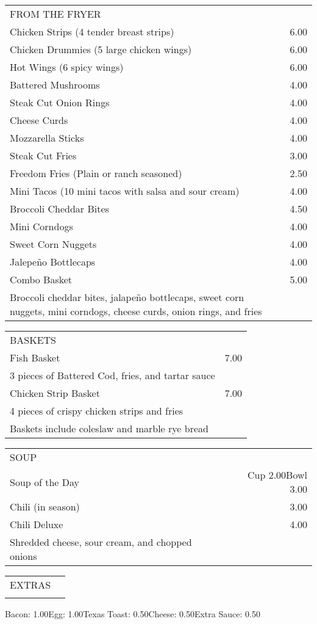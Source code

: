 \documentclass[10pt,notitlepage]{article}
\makeatletter
\newcommand*\ColText[1]{\uppercase{#1}}
\newenvironment{Group}[1]
	{\noindent\begin{tabular*}{\textwidth}{@{}p{.8\linewidth}@{\extracolsep{\fill}}r@{}}
		{\centering\fontsize{16}{20}\selectfont\ColText{#1}}\\[0.8em]\par}
	{\end{tabular*}}
\newcommand*\Item[2]{%
	\sffamily#1\dotfill & #2}
\newcommand*\Desc[1]{%
	\hspace*{1em}\footnotesize #1}
\makeatother
\begin{document}
	\begin{Group}{From the Fryer}
		\Item{Chicken Strips (4 tender breast strips)}{6.00} \\
		\Item{Chicken Drummies (5 large chicken wings)}{6.00} \\
		\Item{Hot Wings (6 spicy wings)}{6.00} \\
		\Item{Battered Mushrooms}{4.00} \\
		\Item{Steak Cut Onion Rings}{4.00} \\
		\Item{Cheese Curds}{4.00} \\
		\Item{Mozzarella Sticks}{4.00} \\
		\Item{Steak Cut Fries}{3.00} \\
		\Item{Freedom Fries (Plain or ranch seasoned)}{2.50} \\
		\Item{Mini Tacos (10 mini tacos with salsa and sour cream)}{4.00} \\
		\Item{Broccoli Cheddar Bites}{4.50} \\
		\Item{Mini Corndogs}{4.00} \\
		\Item{Sweet Corn Nuggets}{4.00} \\
		\Item{Jalepe\~{n}o Bottlecaps}{4.00} \\
		\Item{Combo Basket}{5.00} \\
		\Desc{Broccoli cheddar bites, jalape\~{n}o bottlecaps, sweet corn nuggets, mini corndogs, cheese curds, onion rings, and fries} \\
	\end{Group}
	
	\vfill{}
	
	\begin{Group}{Baskets}
		\Item{Fish Basket}{7.00} \\
		\Desc{3 pieces of Battered Cod, fries, and tartar sauce} \\
		\Item{Chicken Strip Basket}{7.00} \\
		\Desc{4 pieces of crispy chicken strips and fries} \\
		Baskets include coleslaw and marble rye bread
	\end{Group}
	
	\vfill{}
	
	\begin{Group}{Soup}
		\Item{Soup of the Day}{Cup 2.00\hspace{0.2in}Bowl 3.00} \\
		\Item{Chili (in season)}{3.00} \\
		\Item{Chili Deluxe}{4.00} \\
		\Desc{Shredded cheese, sour cream, and chopped onions} \\
	\end{Group}
	
	\vfill{}
	
	\begin{Group}{Extras}
	\end{Group}
	\centering Bacon: 1.00\hspace{0.2in}Egg: 1.00\hspace{0.2in}Texas Toast: 0.50\hspace{0.2in}Cheese: 0.50\hspace{0.2in}Extra Sauce: 0.50\par
	
\end{document}

